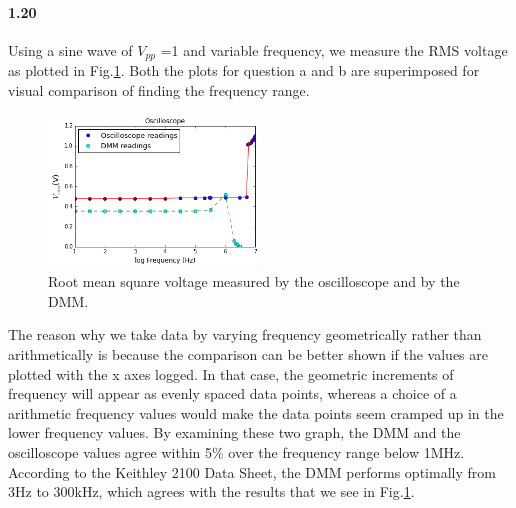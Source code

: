 \documentclass[authoryear, 12pt,5p, times]{elsarticle}
\begin{document}
\paragraph{\textbf{1.20}} 
Using a sine wave of $V_{pp}$ =1 and variable frequency, we measure the RMS voltage as plotted in Fig.\ref{1_20}. Both the plots for question a and b are superimposed for visual comparison of finding the frequency range.\begin{figure}[h!]
\includegraphics[width=0.5\textwidth]{figure/1_20}
\caption{Root mean square voltage measured by the oscilloscope and by the DMM.}
\label{1_20}
\end{figure}  
\par The reason why we take data by varying frequency geometrically rather than arithmetically is because the comparison can be better shown if the values are plotted with the x axes logged. In that case, the geometric increments of frequency will appear as evenly spaced data points, whereas a choice of a arithmetic frequency values would make the data points seem cramped up in the lower frequency values. By examining these two graph, the DMM and the oscilloscope values agree within 5\% over the frequency range below 1MHz. According to the Keithley 2100 Data Sheet, the DMM performs optimally from 3Hz to 300kHz, which agrees with the results that we see in Fig.\ref{1_20}.
\end{document}
